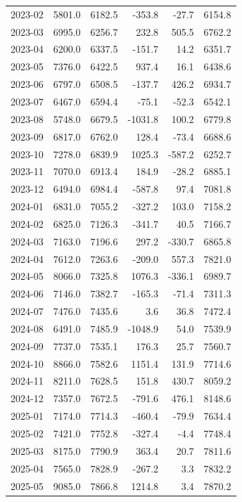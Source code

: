 \begin{longtable}{lrrrrr}
2023-02 & 5801.0 & 6182.5 & -353.8 & -27.7 & 6154.8 \\ 
2023-03 & 6995.0 & 6256.7 & 232.8 & 505.5 & 6762.2 \\ 
2023-04 & 6200.0 & 6337.5 & -151.7 & 14.2 & 6351.7 \\ 
2023-05 & 7376.0 & 6422.5 & 937.4 & 16.1 & 6438.6 \\ 
2023-06 & 6797.0 & 6508.5 & -137.7 & 426.2 & 6934.7 \\ 
2023-07 & 6467.0 & 6594.4 & -75.1 & -52.3 & 6542.1 \\ 
2023-08 & 5748.0 & 6679.5 & -1031.8 & 100.2 & 6779.8 \\ 
2023-09 & 6817.0 & 6762.0 & 128.4 & -73.4 & 6688.6 \\ 
2023-10 & 7278.0 & 6839.9 & 1025.3 & -587.2 & 6252.7 \\ 
2023-11 & 7070.0 & 6913.4 & 184.9 & -28.2 & 6885.1 \\ 
2023-12 & 6494.0 & 6984.4 & -587.8 & 97.4 & 7081.8 \\ 
2024-01 & 6831.0 & 7055.2 & -327.2 & 103.0 & 7158.2 \\ 
2024-02 & 6825.0 & 7126.3 & -341.7 & 40.5 & 7166.7 \\ 
2024-03 & 7163.0 & 7196.6 & 297.2 & -330.7 & 6865.8 \\ 
2024-04 & 7612.0 & 7263.6 & -209.0 & 557.3 & 7821.0 \\ 
2024-05 & 8066.0 & 7325.8 & 1076.3 & -336.1 & 6989.7 \\ 
2024-06 & 7146.0 & 7382.7 & -165.3 & -71.4 & 7311.3 \\ 
2024-07 & 7476.0 & 7435.6 & 3.6 & 36.8 & 7472.4 \\ 
2024-08 & 6491.0 & 7485.9 & -1048.9 & 54.0 & 7539.9 \\ 
2024-09 & 7737.0 & 7535.1 & 176.3 & 25.7 & 7560.7 \\ 
2024-10 & 8866.0 & 7582.6 & 1151.4 & 131.9 & 7714.6 \\ 
2024-11 & 8211.0 & 7628.5 & 151.8 & 430.7 & 8059.2 \\ 
2024-12 & 7357.0 & 7672.5 & -791.6 & 476.1 & 8148.6 \\ 
2025-01 & 7174.0 & 7714.3 & -460.4 & -79.9 & 7634.4 \\ 
2025-02 & 7421.0 & 7752.8 & -327.4 & -4.4 & 7748.4 \\ 
2025-03 & 8175.0 & 7790.9 & 363.4 & 20.7 & 7811.6 \\ 
2025-04 & 7565.0 & 7828.9 & -267.2 & 3.3 & 7832.2 \\ 
2025-05 & 9085.0 & 7866.8 & 1214.8 & 3.4 & 7870.2 \\ 

\end{longtable}
